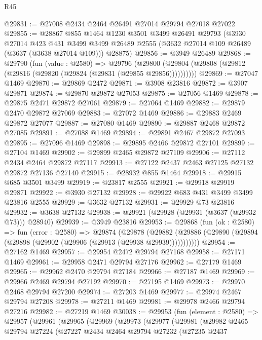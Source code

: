\begin{lexlean}{R45}
\begin{coremodule}
@29831 := @27008 @2434 @2464 @26491 @27014 @29794 @27018 @27022
@29855 := @28867
    @855
    @1464
    @1230
    @3501
    @3499
    @26491
    @29793
    (@3930
      @27014
      @423
      @431
      @3499
      @3499
      @26489
      @2555
      (@3632 @27014 @109 @26489 (@3637 (@3638 @27014 @109)))
      @28875)
@29856 := @3949 @26489
@29868 := @29790
    (fun (value : @2580) =>
    @29796 (@29800 (@29804 (@29808 (@29812 (@29816 (@29820 (@29824 (@29831 (@29855 @29856))))))))))
@29869 := @27047 @1469
@29870 := @29869 @2472
@29871 := @3908 @23816
@29872 := @3907 @29871
@29874 := @29870 @29872 @27053
@29875 := @27056 @1469
@29878 := @29875 @2471 @29872 @27061
@29879 := @27064 @1469
@29882 := @29879 @2470 @29872 @27069
@29883 := @27072 @1469
@29886 := @29883 @2469 @29872 @27077
@29887 := @27080 @1469
@29890 := @29887 @2468 @29872 @27085
@29891 := @27088 @1469
@29894 := @29891 @2467 @29872 @27093
@29895 := @27096 @1469
@29898 := @29895 @2466 @29872 @27101
@29899 := @27104 @1469
@29902 := @29899 @2465 @29872 @27109
@29906 := @27112 @2434 @2464 @29872 @27117
@29913 := @27122 @2437 @2463 @27125 @27132 @29872 @27136 @27140
@29915 := @28932 @855 @1464
@29918 := @29915 @685 @3501 @3499
@29919 := @23817 @2555
@29921 := @29918 @29919 @29871
@29922 := @3930 @27132
@29928 := @29922 @683 @431 @3499 @3499 @23816 @2555
@29929 := @3632 @27132
@29931 := @29929 @73 @23816
@29932 := @3638 @27132
@29938 := @29921 (@29928 (@29931 (@3637 (@29932 @73))) @28940)
@29939 := @3949 @23816
@29953 := @29868
    (fun (ok : @2580) =>
    fun (error : @2580) =>
    @29874
      (@29878
        (@29882 (@29886 (@29890 (@29894 (@29898 (@29902 (@29906 (@29913 (@29938 @29939)))))))))))
@29954 := @27162 @1469
@29957 := @29954 @2472 @29794 @27168
@29958 := @27171 @1469
@29961 := @29958 @2471 @29794 @27176
@29962 := @27179 @1469
@29965 := @29962 @2470 @29794 @27184
@29966 := @27187 @1469
@29969 := @29966 @2469 @29794 @27192
@29970 := @27195 @1469
@29973 := @29970 @2468 @29794 @27200
@29974 := @27203 @1469
@29977 := @29974 @2467 @29794 @27208
@29978 := @27211 @1469
@29981 := @29978 @2466 @29794 @27216
@29982 := @27219 @1469
@30038 := @29953
    (fun (element : @2580) =>
    @29957
      (@29961
        (@29965
          (@29969
            (@29973
              (@29977
                (@29981
                  (@29982
                    @2465
                    @29794
                    @27224
                    (@27227
                      @2434
                      @2464
                      @29794
                      @27232
                      (@27235
                        @2437

\end{coremodule}
\end{lexlean}
